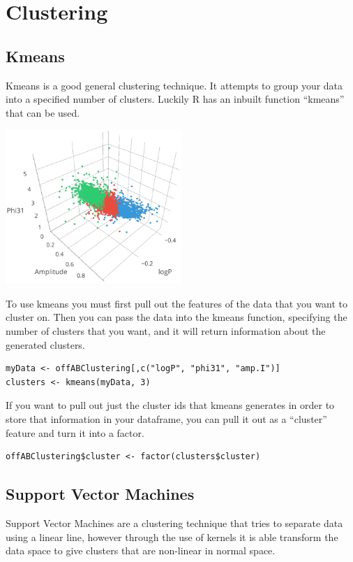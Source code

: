 \chapter{Clustering}

\section{Kmeans}
Kmeans is a good general clustering technique. It attempts to group your data into a specified number of clusters. Luckily R has an inbuilt  function ``kmeans'' that can be used.

\begin{center}
	\includegraphics[width=0.5\textwidth]{images/kmeans_01.png}
\end{center}

To use kmeans you must first pull out the features of the data that you want to cluster on. Then you can pass the data into the kmeans function, specifying the number of clusters that you want, and it will return information about the generated clusters.

\begin{verbatim}
myData <- offABClustering[,c("logP", "phi31", "amp.I")]
clusters <- kmeans(myData, 3)
\end{verbatim}

If you want to pull out just the cluster ids that kmeans generates in order to store that information in your dataframe, you can pull it out as a ``cluster'' feature and turn it into a factor.

\begin{verbatim}
offABClustering$cluster <- factor(clusters$cluster)
\end{verbatim}

\section{Support Vector Machines}
Support Vector Machines are a clustering technique that tries to separate data using a linear line, however through the use of kernels it is able transform the data space to give clusters that are non-linear in normal space.

